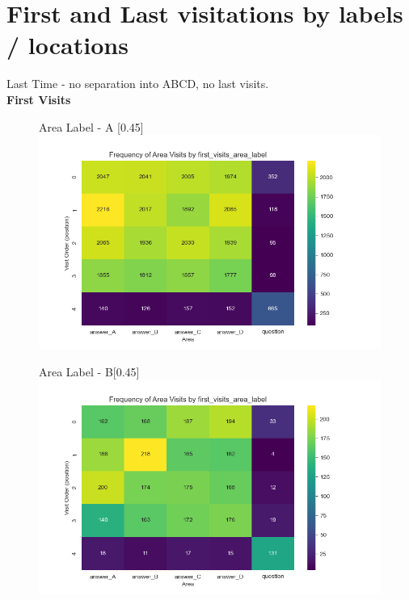 \documentclass{article}
\begin{document}
\section{First and Last visitations by labels / locations}

Last Time - no separation into ABCD, no last visits. 
\\

\textbf{First Visits}

\begin{figure}[H]
  \centering
  \begin{subcaptionbox}{Area Label - A \label{fig:al_a}}[0.45\textwidth]
    {\centering\includegraphics[width=\linewidth]{plots/visits/matrix_first_visits_first_visits_area_label_hunters_A (hunters).png}}
  \end{subcaptionbox}
  \hfill
  \begin{subcaptionbox}{Area Label - B\label{fig:al_b}}[0.45\textwidth]
    {\centering\includegraphics[width=\linewidth]{plots/visits/matrix_first_visits_first_visits_area_label_hunters_B (hunters).png}}
  \end{subcaptionbox}
  

\end{figure}
\end{document}
